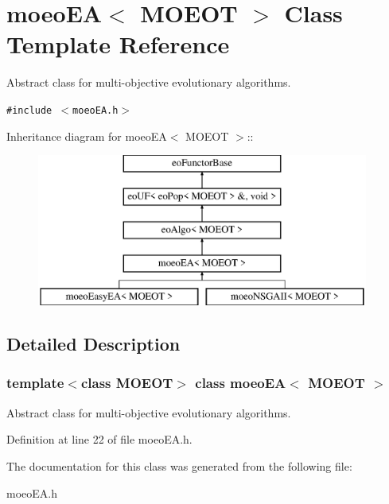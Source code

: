 \section{moeo\-EA$<$ MOEOT $>$ Class Template Reference}
\label{classmoeoEA}
Abstract class for multi-objective evolutionary algorithms.  


{\tt \#include $<$moeo\-EA.h$>$}

Inheritance diagram for moeo\-EA$<$ MOEOT $>$::\begin{figure}[H]
\begin{center}
\leavevmode
\includegraphics[height=5cm]{classmoeoEA}
\end{center}
\end{figure}


\subsection{Detailed Description}
\subsubsection*{template$<$class MOEOT$>$ class moeo\-EA$<$ MOEOT $>$}

Abstract class for multi-objective evolutionary algorithms. 



Definition at line 22 of file moeo\-EA.h.

The documentation for this class was generated from the following file:\begin{CompactItemize}
\item 
moeo\-EA.h\end{CompactItemize}
